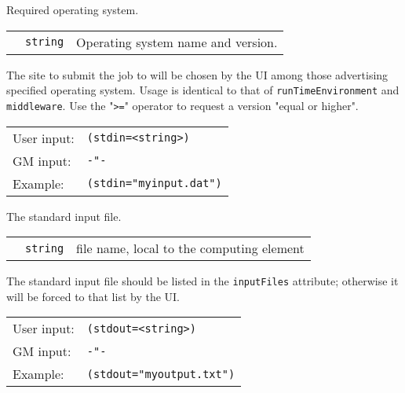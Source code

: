   Required operating system.

  \begin{tabular}{llp{10cm}}
    \hspace*{1cm}&\texttt{string} & Operating system name and version.\\
  \end{tabular}

  The site to submit the job to will be chosen by the UI among those
  advertising specified operating system. Usage is identical to that of
  \texttt{runTimeEnvironment} and \texttt{middleware}. Use the "\verb#>=#" operator to
  request a version "equal or higher".

  \hspace*{0.5cm}
  \begin{shaded}
  \end{shaded}
  \begin{tabular}{lp{13cm}}
    User input:&\verb#(stdin=<string>)#\\
    GM input:&\verb#-"-#\\
    Example:&\verb#(stdin="myinput.dat")#\\
  \end{tabular}

  The standard input file.

  \begin{tabular}{llp{10cm}}
    \hspace*{1cm}&\texttt{string} & file name, local to the computing element\\
  \end{tabular}

  The standard input file should be listed in the \texttt{inputFiles}
  attribute; otherwise it will be forced to that list by the UI.

  \hspace*{0.5cm}
  \begin{shaded}
  \end{shaded}
  \begin{tabular}{lp{13cm}}
    User input:&\verb#(stdout=<string>)#\\
    GM input:&\verb#-"-#\\
    Example:&\verb#(stdout="myoutput.txt")#\\
  \end{tabular}

